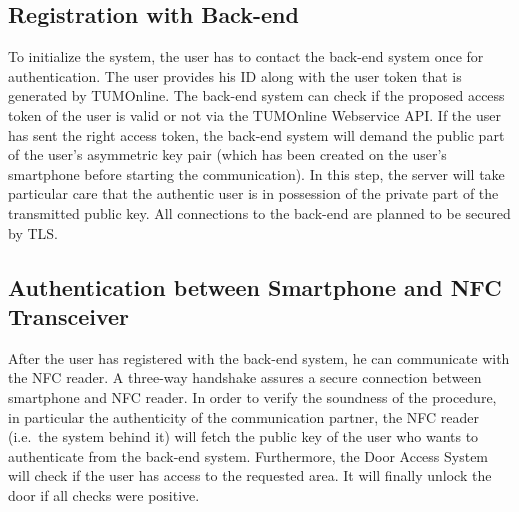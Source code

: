 \subsection{Registration with Back-end}
To initialize the system, the user has to contact the back-end system once for authentication.
The user provides his ID along with the user token that is generated by TUMOnline.
The back-end system can check if the proposed access token of the user is valid or not via the TUMOnline Webservice API.
If the user has sent the right access token, the back-end system will demand the public part of the user's asymmetric key pair (which has been created on the user's smartphone before starting the communication).
In this step, the server will take particular care that the authentic user is in possession of the private part of the transmitted public key.
All connections to the back-end are planned to be secured by TLS.


\subsection{Authentication between Smartphone and NFC Transceiver}
After the user has registered with the back-end system, he can communicate with the NFC reader. 
A three-way handshake assures a secure connection between smartphone and NFC reader.
In order to verify the soundness of the procedure, in particular the authenticity of the communication partner, the NFC reader (i.e.~the system behind it) will fetch the public key of the user who wants to authenticate from the back-end system.
Furthermore, the Door Access System will check if the user has access to the requested area.
It will finally unlock the door if all checks were positive.
